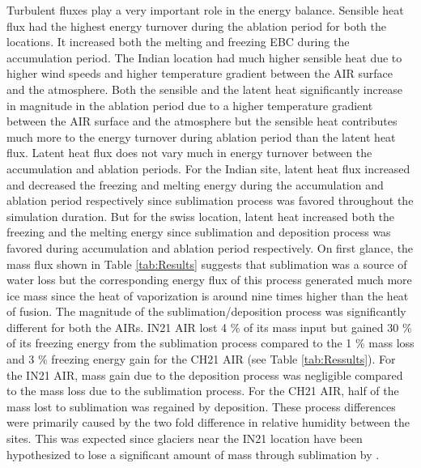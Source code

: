 \documentclass[utf8]{frontiersSCNS}
\begin{document}
Turbulent fluxes play a very important role in the energy balance. Sensible heat flux had the highest energy
turnover during the ablation period for both the locations. It increased both the melting and freezing EBC
during the accumulation period. The Indian location had much higher sensible heat due to higher wind speeds and
higher temperature gradient between the AIR surface and the atmosphere. Both the sensible and the latent heat
significantly increase in magnitude in the ablation period due to a higher temperature gradient between the AIR
surface and the atmosphere but the sensible heat contributes much more to the energy turnover during ablation
period than the latent heat flux. Latent heat flux does not vary much in energy turnover between the
accumulation and ablation periods. For the Indian site, latent heat flux increased and decreased the freezing
and melting energy during the accumulation and ablation period respectively since sublimation process was
favored throughout the simulation duration. But for the swiss location, latent heat increased both the freezing
and the melting energy since sublimation and deposition process was favored during accumulation and ablation
period respectively. On first glance, the mass flux shown in Table \ref{tab:Results} suggests that
sublimation was a source of water loss but the corresponding energy flux of this process generated much more ice
mass since the heat of vaporization is around nine times higher than the heat of fusion. The magnitude of the
sublimation/deposition process was significantly different for both the AIRs.  IN21 AIR lost 4 \% of its mass
input but gained 30 \% of its freezing energy from the sublimation process compared to the 1 \% mass loss and 3
\% freezing energy gain for the CH21 AIR (see Table \ref{tab:Ressults}). For the IN21 AIR, mass gain due to
the deposition process was negligible compared to the mass loss due to the sublimation process. For the CH21
AIR, half of the mass lost to sublimation was regained by deposition. These process differences were primarily
caused by the two fold difference in relative humidity between the sites. This was expected since glaciers near
the IN21 location have been hypothesized to lose a significant amount of mass through sublimation by
\cite{azam_2018}.
\end{document}

